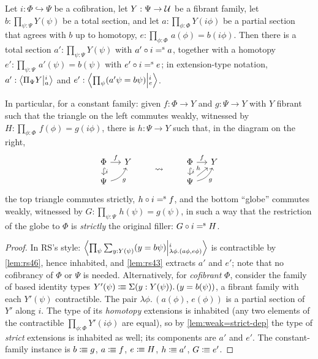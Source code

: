 \begin{lemma}\label{lem:rs410}\label{cor:RS-equiv-ext}
	Let $i : \Phi \hookrightarrow \Psi$ be a cofibration,
	let $Y : \Psi \to \UU$ be a fibrant family, let
	$b : \prod_{\psi:\Psi} Y(\psi)$ be a total section, and let
	$a : \prod_{\phi:\Phi} Y(i\phi)$ be a partial section that agrees with $b$
	up to homotopy, $e : \prod_{\phi:\Phi}\, a(\phi) = b(i\phi)$.
	Then there is a total section $a' : \prod_{\psi:\Psi} Y(\psi)$ with
	$a' \circ i \seq a$, together with a homotopy
	$e' : \prod_{\psi:\Psi}\, a'(\psi) = b(\psi)$ with $e' \circ i \seq e$;
	in
	extension-type notation, $a':\Ext{i}{\Pi_\Psi Y}{a}$ and
	$e':\Ext{i}{\prod_{\psi}(a'\psi=b\psi)}{e}$.

	In particular, for a constant family: given $f : \Phi \to Y$ and
	$g : \Psi \to Y$ with $Y$ fibrant such that the triangle on the left
	commutes weakly, witnessed by
	$H : \prod_{\phi:\Phi}\, f(\phi) = g(i\phi)$, there is $h : \Psi \to Y$
	such that, in the diagram on the right,
	\[
		\begin{tikzcd}[column sep=small, row sep=small]
			\Phi  \ar[r,"f"] \ar[d,hookrightarrow,"i"]
			& Y \\
			\Psi \ar[ur,"g"',bend right] &
		\end{tikzcd}
		\qquad\rightsquigarrow\qquad
		\begin{tikzcd}[column sep=small, row sep=small]
			\Phi  \ar[r,"f"] \ar[d,hookrightarrow,"i"]
			& Y  \\
			\Psi \ar[ur,"g"',bend right] \ar[ur,"h"]&
		\end{tikzcd}
	\]
	the top triangle commutes strictly, $h \circ i \seq f$, and the bottom
	\enquote{globe} commutes weakly, witnessed by
	$G : \prod_{\psi:\Psi}\, h(\psi) = g(\psi)$, in such a way that the
	restriction of the globe to $\Phi$ is \emph{strictly} the original
	filler: $G \circ i \seq H$.
\end{lemma}
\begin{proof}
	In RS's style:
	$\Ext{i}{\prod_{\psi}\sum_{y:Y(\psi)}(y=b\psi)}{\lambda\phi.(a\phi,e\phi)}$
	is contractible by \cref{lem:rs46}, hence inhabited, and \cref{lem:rs43}
	extracts $a'$ and $e'$; note that no cofibrancy of $\Phi$ or $\Psi$ is
	needed. Alternatively, for \emph{cofibrant} $\Phi$, consider the family
	of based identity types
	$Y'(\psi) \colonequiv \Sigma(y : Y(\psi)).\,(y = b(\psi))$, a fibrant
	family with each $Y'(\psi)$ contractible. The pair
	$\lambda\phi.\,(a(\phi),\, e(\phi))$ is a partial section of $Y'$ along
	$i$. The type of its \emph{homotopy} extensions is inhabited (any two
	elements of the contractible $\prod_{\phi:\Phi} Y'(i\phi)$ are equal),
	so by \cref{lem:weak=strict-dep} the type of \emph{strict} extensions
	is inhabited as well; its components are $a'$ and $e'$.
	The constant-family instance is
	$b \colonequiv g$, $a \colonequiv f$, $e \colonequiv H$,
	$h \colonequiv a'$, $G \colonequiv e'$.
\end{proof}


